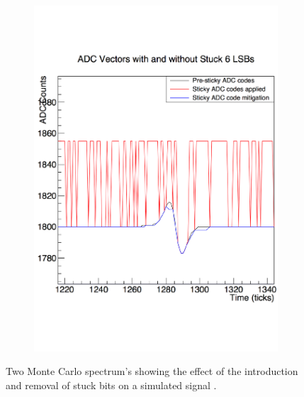\begin{figure}[h!]
\begin{subfigure}{0.45\textwidth}
    \includegraphics[width=\textwidth]{StuckCodes2}
  \end{subfigure}
  \caption[Recovering stuck ADC codes in the 35 ton]
          {Two Monte Carlo spectrum's showing the effect of the introduction and removal of stuck bits on a simulated signal \citep{InslerStuckCode}.}
          \label{fig:StuckCodes}
\end{figure}


